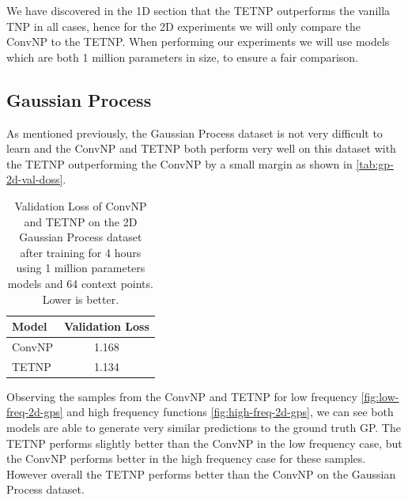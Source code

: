 \documentclass[../../main.tex]{subfiles}
\begin{document}
We have discovered in the 1D section that the TETNP outperforms the vanilla TNP in all cases, hence for the 2D experiments we will only compare the ConvNP to the TETNP. When performing our experiments we will use models which are both 1 million parameters in size, to ensure a fair comparison.

\subsection{Gaussian Process}

As mentioned previously, the Gaussian Process dataset is not very difficult to learn and the ConvNP and TETNP both perform very well on this dataset with the TETNP outperforming the ConvNP by a small margin as shown in \autoref{tab:gp-2d-val-doss}.

\begin{table}[ht]
    \centering
    \begin{tabular}{lc}
        \toprule
        Model  & Validation Loss \\
        \midrule
        ConvNP & 1.168           \\
        TETNP  & 1.134           \\
        \bottomrule
    \end{tabular}
    \caption{Validation Loss of ConvNP and TETNP on the 2D Gaussian Process dataset after training for 4 hours using 1 million parameters models and 64 context points. Lower is better.}
    \label{tab:gp-2d-val-doss}
\end{table}

Observing the samples from the ConvNP and TETNP for low frequency \autoref{fig:low-freq-2d-gps} and high frequency functions \autoref{fig:high-freq-2d-gps}, we can see both models are able to generate very similar predictions to the ground truth GP. The TETNP performs slightly better than the ConvNP in the low frequency case, but the ConvNP performs better in the high frequency case for these samples. However overall the TETNP performs better than the ConvNP on the Gaussian Process dataset.

\end{document}
